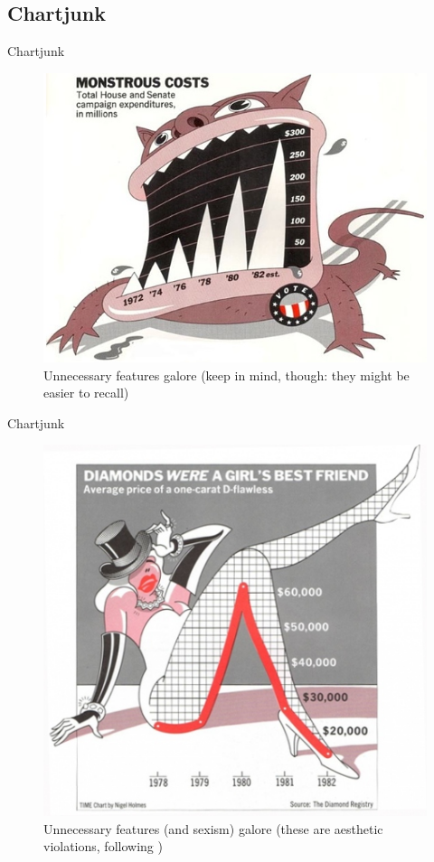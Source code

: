 \documentclass[12pt,english,pdf,dvipsnames,handout]{beamer}
\begin{document}
\subsection{Chartjunk}
\begin{frame}{Chartjunk}

\begin{figure}
  \centering
  \includegraphics[scale=0.4]{../04-graphs/10_Monster_costs}
  \caption{Unnecessary features galore (keep in mind, though: they might be easier to recall)}
\end{figure}

\end{frame}


\begin{frame}{Chartjunk}

\begin{figure}
  \centering
  \includegraphics[scale=0.4]{../04-graphs/11_Diamonds}
  \caption{Unnecessary features (and sexism) galore (these are aesthetic violations, following )}
\end{figure}

\end{frame}
\end{document}
